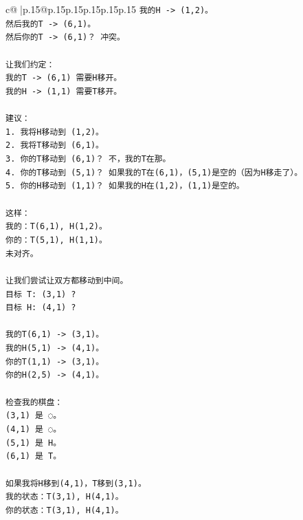 \documentclass{article}
\begin{document}
{\begin{supertabular}{c@{$\;$}|p{.15\linewidth}@{}p{.15\linewidth}p{.15\linewidth}p{.15\linewidth}p{.15\linewidth}p{.15\linewidth}}
{{{\texttt{我的H {-}> (1,2)。} \\
\texttt{然后我的T {-}> (6,1)。} \\
\texttt{然后你的T {-}> (6,1)？ 冲突。} \\
\\ 
\texttt{让我们约定：} \\
\texttt{我的T {-}> (6,1) 需要H移开。} \\
\texttt{我的H {-}> (1,1) 需要T移开。} \\
\\ 
\texttt{建议：} \\
\texttt{1. 我将H移动到 (1,2)。} \\
\texttt{2. 我将T移动到 (6,1)。} \\
\texttt{3. 你的T移动到 (6,1)？ 不，我的T在那。} \\
\texttt{4. 你的T移动到 (5,1)？ 如果我的T在(6,1)，(5,1)是空的（因为H移走了）。} \\
\texttt{5. 你的H移动到 (1,1)？ 如果我的H在(1,2)，(1,1)是空的。} \\
\\ 
\texttt{这样：} \\
\texttt{我的：T(6,1), H(1,2)。} \\
\texttt{你的：T(5,1), H(1,1)。} \\
\texttt{未对齐。} \\
\\ 
\texttt{让我们尝试让双方都移动到中间。} \\
\texttt{目标 T: (3,1) ?} \\
\texttt{目标 H: (4,1) ?} \\
\\ 
\texttt{我的T(6,1) {-}> (3,1)。} \\
\texttt{我的H(5,1) {-}> (4,1)。} \\
\texttt{你的T(1,1) {-}> (3,1)。} \\
\texttt{你的H(2,5) {-}> (4,1)。} \\
\\ 
\texttt{检查我的棋盘：} \\
\texttt{(3,1) 是 ◌。} \\
\texttt{(4,1) 是 ◌。} \\
\texttt{(5,1) 是 H。} \\
\texttt{(6,1) 是 T。} \\
\\ 
\texttt{如果我将H移到(4,1)，T移到(3,1)。} \\
\texttt{我的状态：T(3,1), H(4,1)。} \\
\texttt{你的状态：T(3,1), H(4,1)。} \\
}}}
\end{supertabular}}
\end{document}
